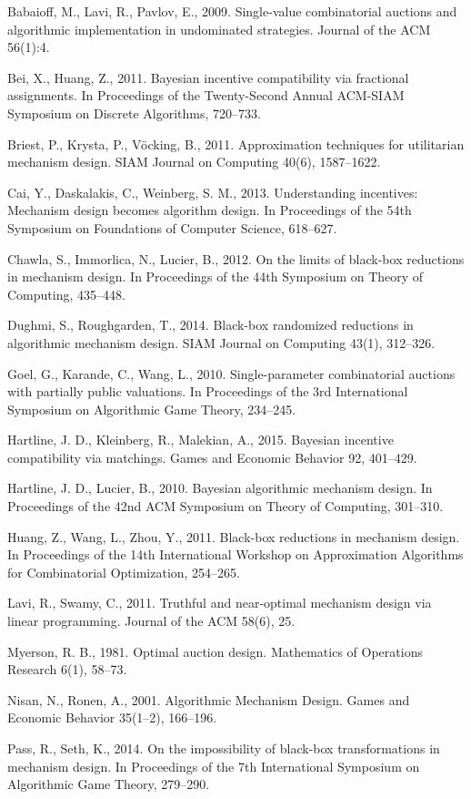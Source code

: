 \documentclass[runningheads,a4paper]{llncs}
\begin{document}
\begin{thebibliography}{99}

 Babaioff, M., Lavi, R., Pavlov, E., 2009. Single-value combinatorial auctions and algorithmic implementation in undominated strategies. Journal of the ACM 56(1):4.

 Bei, X., Huang, Z., 2011. Bayesian incentive compatibility via fractional assignments. In Proceedings of the Twenty-Second Annual ACM-SIAM Symposium on Discrete Algorithms, 720--733.


 Briest, P., Krysta, P., V\"{o}cking, B., 2011. Approximation techniques for utilitarian mechanism design. SIAM Journal on Computing 40(6), 1587--1622.

 Cai, Y., Daskalakis, C., Weinberg, S. M., 2013. Understanding incentives: Mechanism design becomes algorithm design. In Proceedings of the 54th Symposium on Foundations of Computer Science, 618--627.

 Chawla, S., Immorlica, N., Lucier, B., 2012. On the limits of black-box reductions in mechanism design. In Proceedings of the 44th Symposium on Theory of Computing, 435--448.

 Dughmi, S., Roughgarden, T., 2014. Black-box randomized reductions in algorithmic mechanism design. SIAM Journal on Computing 43(1), 312--326.

 Goel, G., Karande, C., Wang, L., 2010. Single-parameter combinatorial auctions with partially public valuations. In Proceedings of the 3rd International Symposium on Algorithmic Game Theory, 234--245.

 Hartline, J. D., Kleinberg, R., Malekian, A., 2015. Bayesian incentive compatibility via matchings. Games and Economic Behavior 92, 401--429.

 Hartline, J. D., Lucier, B., 2010. Bayesian algorithmic mechanism design. In Proceedings of the 42nd ACM Symposium on Theory of Computing, 301--310.

 Huang, Z., Wang, L., Zhou, Y., 2011. Black-box reductions in mechanism design. In Proceedings of the 14th International Workshop on Approximation Algorithms for Combinatorial Optimization, 254--265.

 Lavi, R., Swamy, C., 2011. Truthful and near-optimal mechanism design via linear programming. Journal of the ACM 58(6), 25.

 Myerson, R. B., 1981. Optimal auction design. Mathematics of Operations Research 6(1), 58--73.

 Nisan, N., Ronen, A., 2001. Algorithmic Mechanism Design. Games and Economic Behavior 35(1--2), 166--196.

 Pass, R., Seth, K., 2014. On the impossibility of black-box transformations in mechanism design. In Proceedings of the 7th International Symposium on Algorithmic Game Theory, 279--290.

\end{thebibliography}
\end{document}
